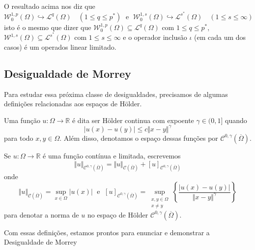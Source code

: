 \documentclass[a4paper, 11pt]{book}
\theoremstyle{definition}
\newcommand{\bR}{\mathbb{R}}
\newcommand{\cC}{\mathcal{C}}
\newcommand{\cL}{\mathcal{L}}
\newcommand{\cW}{\mathcal{W}}
\begin{document}
O resultado acima nos diz que
\[
    \cW^{1,p}_0(\Omega) \hookrightarrow \cL^q(\Omega) \quad (1 \leqslant q \leqslant p^*) \;\text{ e }\; \cW^{1,s}_0(\Omega) \hookrightarrow \cL^{s^*}(\Omega) \quad (1 \leqslant s \leqslant \infty)
\]
isto é o mesmo que dizer que $\cW^{1,p}_0(\Omega) \subseteq \cL^q(\Omega)$ com $1 \leqslant q \leqslant p^*$, $\cW^{1,s}(\Omega) \subseteq \cL^{s^*}(\Omega)$ com $1 \leqslant s \leqslant \infty$ e o operador inclusão $\iota$ (em cada um dos casos) é um operados linear limitado.

\subsection{Desigualdade de Morrey}

Para estudar essa próxima classe de desigualdades, precisamos de algumas definições relacionadas aos espaços de Hölder.

\begin{dbox}
    Uma função $u : \Omega \to \bR$ é dita ser Hölder continua com expoente $\gamma \in (0,1]$ quando
    \[
        |u(x) - u(y)| \leqslant c \Vert x - y \Vert^\gamma
    \]
    para todo $x,y \in \Omega$. Além disso, denotamos o espaço dessas funções por $\cC^{0,\gamma}(\overline\Omega)$.
\end{dbox}

\begin{dbox}
    Se $u : \Omega \to \bR$ é uma função contínua e limitada, escrevemos
    \[
        \Vert u \Vert_{\cC^{0,\gamma}(\overline\Omega)} = \Vert u \Vert_{\cC(\overline\Omega)} + [u]_{\cC^{0,\gamma}(\overline\Omega)}
    \]
    onde
    \[
        \Vert u \Vert_{\cC(\overline\Omega)} = \sup_{x \in \Omega} |u(x)| \;\text{ e }\; [u]_{\cC^{0,\gamma}(\overline\Omega)} = \sup_{\substack{x,y \in \Omega\\x \neq y}} \left\{ \frac{|u(x) - u(y)|}{\Vert x - y \Vert^\gamma} \right\}
    \]
    para denotar a norma de $u$ no espaço de Hölder $\cC^{0,\gamma}(\overline\Omega)$.
\end{dbox}

Com essas definições, estamos prontos para enunciar e demonstrar a Desigualdade de Morrey
\end{document}
